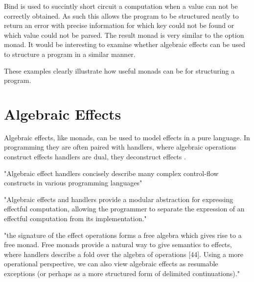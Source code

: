 \documentclass[a4paper,10pt]{article}
\theoremstyle{definition}
\begin{document}
Bind is used to succintly short circuit a computation when a value can not be
correctly obtained. As such this allows the program to be structured neatly to return
an error with precise information for which key could not be found or which value could
not be parsed. The result monad is very similar to the option monad. It would be interesting
to examine whether algebraic effects can be used to structure a program in a similar manner.

These examples clearly illustrate how useful monads can be for structuring a program.

\section{Algebraic Effects}

Algebraic effects, like monads, can be used to model effects in a pure language.
In programming they are often paired with handlers, where algebraic operations construct effects
handlers are dual, they deconstruct effects \cite{plotkin2009handlers}.

"Algebraic effect handlers concisely describe many complex control-flow constructs
in various programming languages" \cite{leijen2017type}

"Algebraic effects and handlers provide a modular abstraction for expressing effectful computation,
allowing the programmer to separate the expression of an effectful computation from its implementation."
\cite{dolan2015effective}

"the signature of the effect operations forms a free algebra which gives rise to a free monad. Free monads provide a natural way to give semantics to effects, where handlers describe a fold over the algebra of operations [44]. Using a more operational perspective, we can also view algebraic effects as resumable exceptions (or perhaps as a more structured form of delimited continuations)." \cite{leijen2017type}


\medskip



\end{document}
